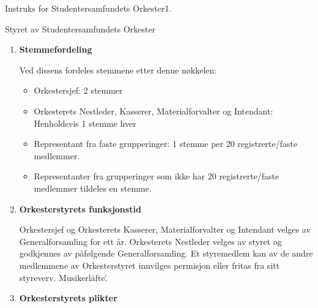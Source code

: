 \begin{instruks}{Instruks for Studentersamfundets Orkester}{1. }{ }
\begin{instruksledd}{Styret av Studentersamfundets Orkester}
\begin{enumerate}
                Observatører med talerett, men uten stemmerett:
                \begin{itemize}
                    \item Med møterett: kontaktperson for midlertidige grupperinger godkjent av styret, samt
                        Orkesterets
                        funksjonærer og dirigenter.
                \end{itemize}

                Orkesterstyrets sammensetning skal så langt som mulig representere medlemmene av Orkesteret,
                med
                særskilt hensyn på grupperingenes størrelse, medlemmenes kjønn og etniske bakgrunn/nasjonalitet.
                Orkesterstyret ledes av Orkestersjefen, som er gjengsjef. Orkestersjefen velges av Generalforsamling
                og må
                godkjennes av Storsalen.

            \item \textbf{Stemmefordeling}

                Ved dissens fordeles stemmene etter denne nøkkelen:

                \begin{itemize}
                    \item Orkestersjef: 2 stemmer
                    \item Orkesterets Nestleder, Kasserer, Materialforvalter og Intendant: Henholdsvis 1
                        stemme hver
                    \item Representant fra faste grupperinger: 1 stemme per 20 registrerte/faste medlemmer.
                    \item Representanter fra grupperinger som ikke har 20 registrerte/faste medlemmer
                        tildeles en stemme.
                \end{itemize}

            \item \textbf{Orkesterstyrets funksjonstid}

                Orkestersjef og Orkesterets Kasserer, Materialforvalter og Intendant velges av Generalforsamling for
                ett år.
                Orkesterets Nestleder velges av styret og godkjennes av påfølgende Generalforsamling. Et styremedlem
                kan
                av de andre medlemmene av Orkesterstyret innvilges permisjon eller fritas fra sitt styreverv.
                Musikerlåfte\'.

            \item \textbf{Orkesterstyrets plikter}


\end{enumerate}
\end{instruksledd}
\end{instruks}
